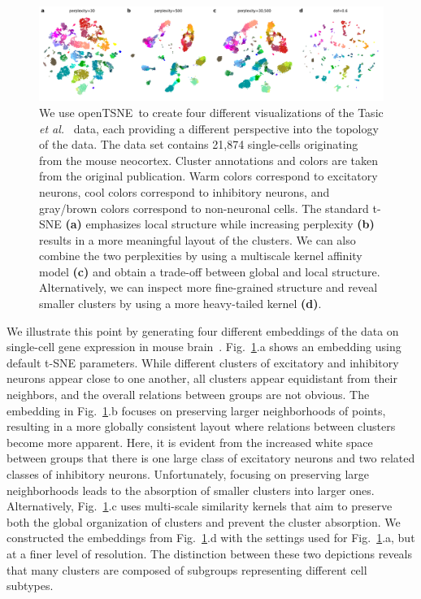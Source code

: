 \documentclass[twocolumn]{article}
\newcommand{\opentsne}{\textsf{openTSNE}}
\begin{document}
\begin{figure}[htbp]
	\includegraphics[width=\textwidth]{tasic2018}
	\caption{\label{fig:tasic}We use \opentsne\ to create four different
	visualizations of the Tasic \textit{et al.}~\cite{tasic2018shared} data,
	each providing a different perspective into the topology of the data.
	The data set contains 21,874 single-cells originating from the mouse
	neocortex. Cluster annotations and colors are taken from the original
	publication. Warm colors correspond to excitatory neurons, cool colors
	correspond to inhibitory neurons, and gray/brown colors correspond to
	non-neuronal cells. The standard t-SNE \textbf{(a)} emphasizes local
	structure while increasing perplexity \textbf{(b)} results in a more
	meaningful layout of the clusters. We can also combine the two
	perplexities by using a multiscale kernel affinity model \textbf{(c)}
	and obtain a trade-off between global and local structure.
	Alternatively, we can inspect more fine-grained structure and reveal
smaller clusters by using a more heavy-tailed kernel \textbf{(d)}.}
\end{figure}

We illustrate this point by generating four different embeddings of the data on
single-cell gene expression in mouse brain~\cite{tasic2018shared}.
Fig.~\ref{fig:tasic}.a shows an embedding using default t-SNE parameters. While
different clusters of excitatory and inhibitory neurons appear close to one
another, all clusters appear equidistant from their neighbors, and the overall
relations between groups are not obvious. The embedding in Fig.~\ref{fig:tasic}.b
focuses on preserving larger neighborhoods of points, resulting in a more
globally consistent layout where relations between clusters become more
apparent. Here, it is evident from the increased white space between groups that
there is one large class of excitatory neurons and two related classes of
inhibitory neurons. Unfortunately, focusing on preserving large neighborhoods
leads to the absorption of smaller clusters into larger ones. Alternatively,
Fig.~\ref{fig:tasic}.c uses multi-scale similarity kernels that aim to preserve
both the global organization of clusters and prevent the cluster absorption. We
constructed the embeddings from Fig.~\ref{fig:tasic}.d with the settings used
for Fig.~\ref{fig:tasic}.a, but at a finer level of resolution. The distinction
between these two depictions reveals that many clusters are composed of
subgroups representing different cell subtypes.
\end{document}
